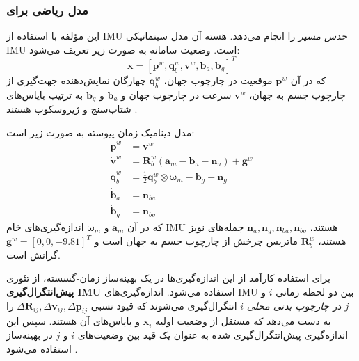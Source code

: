 \documentclass[11pt, a4paper]{article}
\begin{document}
	\subsubsection{مدل ریاضی برای }
	این مؤلفه با استفاده از \gls{IMU} \emph{حدس مسیر} را انجام می‌دهد. هسته آن مدل سینماتیکی IMU است. وضعیت سامانه به صورت زیر تعریف می‌شود:
	\[
	\mathbf{x} = \left[ \mathbf{p}^w, \mathbf{q}^w_b, \mathbf{v}^w, \mathbf{b}_a, \mathbf{b}_g \right]^T
	\]
	که در آن $\mathbf{p}^w$ موقعیت در چارچوب جهان، $\mathbf{q}^w_b$ چهارگان نمایش‌دهنده جهت‌گیری از چارچوب جسم به جهان، $\mathbf{v}^w$ سرعت در چارچوب جهان و $\mathbf{b}_a$ و $ \mathbf{b}_g$ به ترتیب بایاس‌های شتاب‌سنج و ژیروسکوپ هستند \cite{forster2015imu}.
	
	مدل دینامیک زمان-پیوسته به صورت زیر است:
	\begin{align*}
		\dot{\mathbf{p}}^w &= \mathbf{v}^w \\
		\dot{\mathbf{v}}^w &= \mathbf{R}^w_b (\mathbf{a}_m - \mathbf{b}_a - \mathbf{n}_a) + \mathbf{g}^w \\
		\dot{\mathbf{q}}^w_b &= \frac{1}{2} \mathbf{q}^w_b \otimes \boldsymbol{\omega}_m - \mathbf{b}_g - \mathbf{n}_g \\
		\dot{\mathbf{b}}_a &= \mathbf{n}_{ba} \\
		\dot{\mathbf{b}}_g &= \mathbf{n}_{bg}
	\end{align*}
	که در آن $\mathbf{a}_m$ و $\boldsymbol{\omega}_m$ اندازه‌گیری‌های خام IMU هستند، $\mathbf{n}_a, \mathbf{n}_g, \mathbf{n}_{ba}, \mathbf{n}_{bg}$ جمله‌های نویز هستند، $\mathbf{R}^w_b$ ماتریس چرخش از چارچوب جسم به جهان است و $\mathbf{g}^w = [0, 0, -9.81]^T$ گرانش است.
	
	برای استفاده کارآمد از این اندازه‌گیری‌ها در یک بهینه‌ساز زمان-گسسته، از تئوری \textbf{پیش‌انتگرال‌گیری IMU} استفاده می‌شود. اندازه‌گیری‌های IMU بین دو لحظه زمانی $i$ و $j$ در \emph{چارچوب بدنی محلی} $i$ انتگرال‌گیری می‌شوند که قیود نسبی $\Delta \mathbf{R}_{ij}, \Delta \mathbf{v}_{ij}, \Delta \mathbf{p}_{ij}$ را به دست می‌دهد که مستقل از وضعیت اولیه $\mathbf{x}_i$ و بایاس‌های آن هستند. سپس این اندازه‌گیری پیش‌انتگرال‌گیری شده به عنوان یک قید بین وضعیت‌های $i$ و $j$ در بهینه‌ساز استفاده می‌شود \cite{forster2016manifold}.
\end{document}
